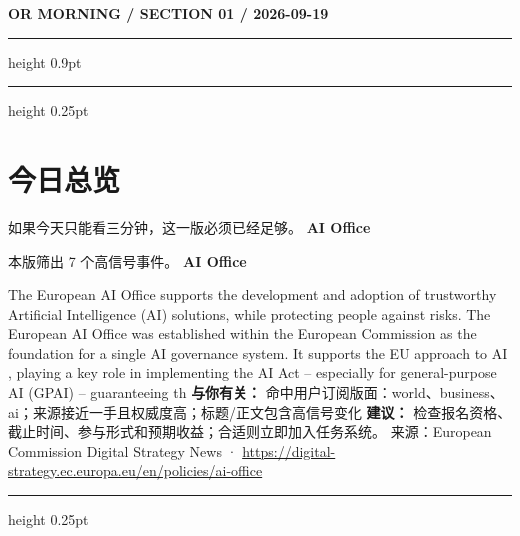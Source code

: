 \documentclass[10.5pt]{ctexart}
\begin{document}
{\small\bfseries OR MORNING / SECTION 01 / 2026-09-19}
\vspace{2mm}
\hrule height 0.9pt
\vspace{1.5mm}
\hrule height 0.25pt
\vspace{4mm}
\section*{今日总览}
{\color{ormuted} 如果今天只能看三分钟，这一版必须已经足够。}
\vspace{2mm}
{\fontsize{25}{29}\selectfont\bfseries AI Office}\par
\vspace{2mm}
{\large 本版筛出 7 个高信号事件。}
\vspace{3mm}
{\Large\bfseries AI Office}\par
The European AI Office supports the development and adoption of trustworthy Artificial Intelligence (AI) solutions, while protecting people against risks. The European AI Office was established within the European Commission as the foundation for a single AI governance system. It supports the EU approach to AI , playing a key role in implementing the AI Act – especially for general-purpose AI (GPAI) – guaranteeing th
\textbf{与你有关：} 命中用户订阅版面：world、business、ai；来源接近一手且权威度高；标题/正文包含高信号变化
\textbf{建议：} 检查报名资格、截止时间、参与形式和预期收益；合适则立即加入任务系统。
{\footnotesize\color{ormuted} 来源：European Commission Digital Strategy News · \url{https://digital-strategy.ec.europa.eu/en/policies/ai-office}}
\vspace{3mm}
\hrule height 0.25pt
\vspace{3mm}
\end{document}

